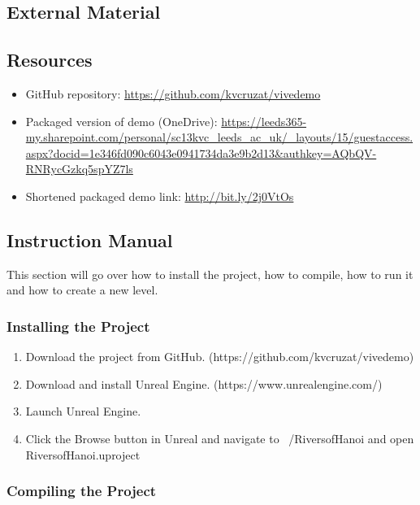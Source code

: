 \begin{appendices}
\chapter{External Material}

\section{Resources}

\begin{itemize}
	\item GitHub repository: \url{https://github.com/kvcruzat/vivedemo}
	\item Packaged version of demo (OneDrive): \url{https://leeds365-my.sharepoint.com/personal/sc13kvc_leeds_ac_uk/_layouts/15/guestaccess.aspx?docid=1e346fd090c6043e0941734da3e9b2d13&authkey=AQbQV-RNRycGzkq5spYZ7ls}
	\item Shortened packaged demo link: \url{http://bit.ly/2j0VtOs}
\end{itemize}

\section{Instruction Manual}

	This section will go over how to install the project, how to compile, how to run it and how to create a new level.

\subsection{Installing the Project}

\begin{enumerate}
	\item Download the project from GitHub. (https://github.com/kvcruzat/vivedemo)
	\item Download and install Unreal Engine. (https://www.unrealengine.com/)
	\item Launch Unreal Engine.
	\item Click the Browse button in Unreal and navigate to ~/RiversofHanoi and open RiversofHanoi.uproject
\end{enumerate}

\subsection{Compiling the Project}


\end{appendices}
